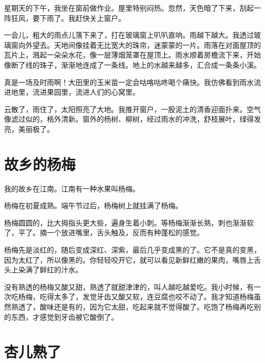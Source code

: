 \documentclass[12pt,UTF-8,openany]{ctexbook}
\begin{document}
\begin{large}
    
    星期天的下午，我坐在窗前做作业。屋里特别闷热。忽然，天色暗了下来，刮起一阵狂风，要下雨了。我赶快关上窗户。
    
    一会儿，粗大的雨点儿落下来了，打在玻璃窗上叭叭直响。雨越下越大。我透过玻璃窗向外望去。天地间像挂着无比宽大的珠帘，迷蒙蒙的一片。雨落在对面屋顶的瓦片上，溅起一朵朵水花，像一层薄烟笼罩在屋顶上。雨水顺着房檐流下来，开始像断了线的珠子，渐渐地连成了一条线。地上的水越来越多，汇合成一条条小溪。
    
    真是一场及时雨啊！大田里的玉米苗一定会咕咯咕咚喝个痛快。我仿佛看到雨水流进地里，流进果园里，流进人们的心窝里。
    
    云散了，雨住了，太阳照亮了大地。我推开窗户，一股泥土的清香迎面扑来。空气像滤过似的，格外清新。窗外的杨树、柳树，经过雨水的冲洗，舒枝展叶，绿得发亮，美丽极了。
    
\end{large}



\chapter{故乡的杨梅}

\begin{large}
    
    我的故乡在江南。江南有一种水果叫杨梅。
    
    杨梅在初夏成熟。端午节过后，杨梅树上就挂满了杨梅。
    
    杨梅圆圆的，比大拇指头更大些，遍身生着小刺。等杨梅渐渐长熟，刺也渐渐软了，平了。摘一个放进嘴里，舌头触及，反而有种蓬松的感觉。
    
    杨梅先是淡红的，随后变成深红、深紫，最后几乎变成黑的了。它不是真的变黑，因为太红了，所以像黑的。你轻轻咬开它，就可以看见新鲜红嫩的果肉，嘴唇上舌头上染满了鲜红的汁水。
    
    没有熟透的杨梅又酸又甜，熟透了就甜津津的，叫人越吃越爱吃。我小时候，有一次吃杨梅，吃得太多了，发觉牙齿又酸又软，连豆腐也咬不动了。我才知道杨梅虽然熟透了，酸味还是有的，因为它太甜，吃起来就不觉得酸了。吃饱了杨梅再吃别的东西，才感觉到牙齿被它酸倒了。
    
\end{large}



\chapter{杏儿熟了}
\end{document}

